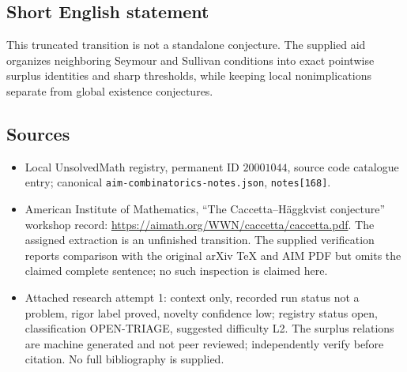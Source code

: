 \documentclass[11pt]{article}
\begin{document}
\subsection{Short English statement}
This truncated transition is not a standalone conjecture. The supplied aid organizes neighboring Seymour and Sullivan conditions into exact pointwise surplus identities and sharp thresholds, while keeping local nonimplications separate from global existence conjectures.
\subsection{Sources}
\begin{itemize}
\item Local UnsolvedMath registry, permanent ID $20001044$, source code catalogue entry; canonical \texttt{aim-combinatorics-notes.json}, \texttt{notes[168]}.
\item American Institute of Mathematics, ``The Caccetta--H\"aggkvist conjecture'' workshop record: \url{https://aimath.org/WWN/caccetta/caccetta.pdf}. The assigned extraction is an unfinished transition. The supplied verification reports comparison with the original arXiv TeX and AIM PDF but omits the claimed complete sentence; no such inspection is claimed here.
\item Attached research attempt 1: context only, recorded run status not a problem, rigor label proved, novelty confidence low; registry status open, classification OPEN-TRIAGE, suggested difficulty L2. The surplus relations are machine generated and not peer reviewed; independently verify before citation. No full bibliography is supplied.
\end{itemize}
\end{document}
